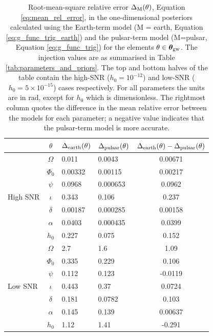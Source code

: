 \documentclass[fleqn,usenatbib,useAMS]{mnras}
\begin{document}
\begin{table}
	\centering
		\begin{tabular}{lcllc}
			\toprule
			&$\theta$ & $\Delta_{\rm earth}(\theta)$ & $\Delta_{\rm pulsar}(\theta)$ & $\Delta_{\rm earth}(\theta) - \Delta_{\rm pulsar}(\theta)$   \\
			\hline
			\multirow{7}{2mm}{High SNR} & $\Omega$       & 0.011& 0.0043& 0.00671\\
			& $\Phi_0$ &0.00332 &0.00115 &0.00217\\
			& $\psi$ &0.0968 &0.000653 &0.0962 \\
			& $\iota$ & 0.343 &0.106 &0.237 \\
			& $\delta$ & 0.00187 &0.000285 &0.00158 \\
			&$\alpha$ &0.0403 &0.000435 &0.0399 \\
			&$h_0$ & 0.227 &0.075 &0.152 \\
			\hline
			\multirow{7}{2mm}{Low SNR} & $\Omega$       & 2.7 &1.6& 1.09 \\
			& $\Phi_0$ &0.335 &0.229 &0.106 \\
			& $\psi$ &0.112 &0.123 &-0.0119 \\
			& $\iota$ & 0.443 &0.37 &0.0724 \\
			& $\delta$ & 0.181 &0.0782 &0.103 \\
			&$\alpha$ &0.145 &0.139 &0.00637 \\
			&$h_0$ & 1.12 &1.41 &-0.291 \\
			\bottomrule
		\end{tabular}
		\caption{Root-mean-square relative error $\Delta_{\rm M}(\theta)$, Equation \eqref{eq:mean_rel_error}, in the one-dimensional posteriors calculated using the Earth-term model (M = earth, Equation \eqref{eq:g_func_trig_earth}) and the pulsar-term model (M=pulsar, Equation \eqref{eq:g_func_trig}) for the elements $\theta \in \boldsymbol{\theta}_{\rm gw}$. The injection values are as summarised in Table \ref{tab:parameters_and_priors}. The top and bottom halves of the table contain the high-SNR ($h_0 = 10^{-12}$) and low-SNR ($h_0 = 5 \times 10^{-15}$) cases respectively.  For all parameters the units are in rad, except for $h_0$ which is dimensionless. The rightmost column quotes the difference in the mean relative error between the models for each parameter; a negative value indicates that the pulsar-term model is more accurate.}
		\label{tab:posterior_errors}
	\end{table}
\end{document}
